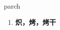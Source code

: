 
\begin{frame}
{\huge parch}
\begin{center}
\begin{enumerate}\Large
  \item \textbf{炽，烤，烤干}
\end{enumerate}
\end{center}
\end{frame}
